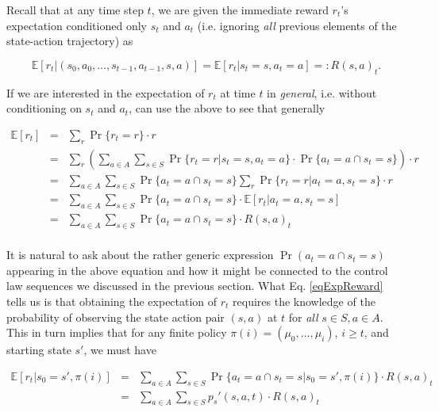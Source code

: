 \documentclass[11pt]{article} %
\begin{document}
Recall that at any time step $t$, we are given the immediate reward $r_t$'s expectation conditioned only $s_t$ and $a_t$ (i.e. ignoring \textit{all} previous elements of the state-action trajectory) as

\begin{equation}
	\mathbb{E}[r_t | (s_0,a_0,\dots,s_{t-1},a_{t-1},s,a)] = \mathbb{E}[r_t | s_t = s, a_t = a] =: R(s,a)_t.
\end{equation}

If we are interested in the expectation of $r_t$ at time $t$ in \textit{general}, i.e. without conditioning on $s_t$ and $a_t$, can use the above to see that generally

\begin{equation}\label{eqExpReward}
	\begin{array}{rcl}
		\mathbb{E}[r_t]	& = &	\sum\limits_r \Pr\{r_t = r\} \cdot r \\
					& = & 	\sum\limits_r \left(\sum\limits_{a \in A} \sum\limits_{s \in S} \Pr\{r_t = r | s_t = s, a_t = a\} \cdot \Pr\{ a_t = a \cap s_t = s \} \right) \cdot r \\
					& = &	\sum\limits_{a \in A} \sum\limits_{s \in S} \Pr \{a_t = a \cap s_t = s\} \sum\limits_r \Pr \{r_t = r | a_t = a, s_t = s\} \cdot r \\
					& = &	\sum\limits_{a \in A} \sum\limits_{s \in S} \Pr \{a_t = a \cap s_t = s\} \cdot \mathbb{E}[r_t | a_t = a, s_t = s] \\
					& = &	\sum\limits_{a \in A} \sum\limits_{s \in S} \Pr \{a_t = a \cap s_t = s\} \cdot R(s,a)_t \\
	\end{array}
\end{equation}

It is natural to ask about the rather generic expression $\Pr(a_t = a \cap s_t = s)$ appearing in the above equation and how it might be connected to the control law sequences we discussed in the previous section. What Eq. \ref{eqExpReward} tells us is that obtaining the expectation of $r_t$ requires the knowledge of the probability of observing the state action pair $(s,a)$ at $t$ for \textit{all} $s \in S, a \in A$. This in turn implies that for any finite policy $\pi(i) = (\mu_0,\dots,\mu_i)$, $i \ge t$, and starting state $s'$, we must have 

\begin{equation}\label{eqExpReward}
	\begin{array}{rcl}
		\mathbb{E}[r_t | s_0 = s', \pi(i)]	& = &	\sum\limits_{a \in A} \sum\limits_{s \in S} \Pr \{a_t = a \cap s_t = s | s_0 = s', \pi(i)\} \cdot R(s,a)_t \\
								& = &	\sum\limits_{a \in A} \sum\limits_{s \in S} p_s'(s,a,t) \cdot R(s,a)_t \\
	\end{array}
\end{equation}
\end{document}
